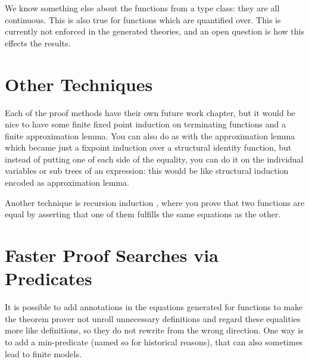 We know something else about the functions from a type class: they are
all continuous. This is also true for functions which are quantified
over. This is currently not enforced in the generated theories, and an
open question is how this effects the results.

\section{Other Techniques}

Each of the proof methods have their own future work chapter, but it
would be nice to have some finite fixed point induction on terminating
functions and a finite approximation lemma. You can also do as with
the approximation lemma which became just a fixpoint induction over a
structural identity function, but instead of putting one of each side
of the equality, you can do it on the individual variables or sub
trees of an expression: this would be like structural induction
encoded as approximation lemma.

Another technique is recursion induction \cite{recind}, where you
prove that two functions are equal by asserting that one of them
fulfills the same equations as the other.

\section{Faster Proof Searches via Predicates}

It is possible to add annotations in the equations generated for
functions to make the theorem prover not unroll unnecessary
definitions and regard these equalities more like definitions, so they
do not rewrite from the wrong direction. One way is to add a
min-predicate (named so for historical reasons), that can also
sometimes lead to finite models.

